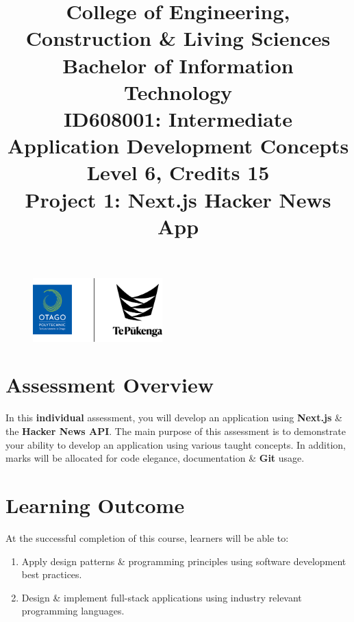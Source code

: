 \documentclass{article}
\author{}
\begin{document}
\begin{figure}
	\centering
	\includegraphics[width=50mm]{../../resources/img/logo.png}
\end{figure}

\title{College of Engineering, Construction \& Living Sciences\\Bachelor of Information Technology\\ID608001: Intermediate Application Development Concepts\\Level 6, Credits 15\\\textbf{Project 1: Next.js Hacker News App}}
\date{}
\maketitle

\section*{Assessment Overview}
In this \textbf{individual} assessment, you will develop an application using \textbf{Next.js} \& the \textbf{Hacker News API}. The main purpose of this assessment is to demonstrate your ability to develop an application using various taught concepts. In addition, marks will be allocated for code elegance, documentation \& \textbf{Git} usage.

\section*{Learning Outcome}
At the successful completion of this course, learners will be able to:
\begin{enumerate}
	\item Apply design patterns \& programming principles using software development best practices.
	\item Design \& implement full-stack applications using industry relevant programming languages.
\end{enumerate}
\end{document}
